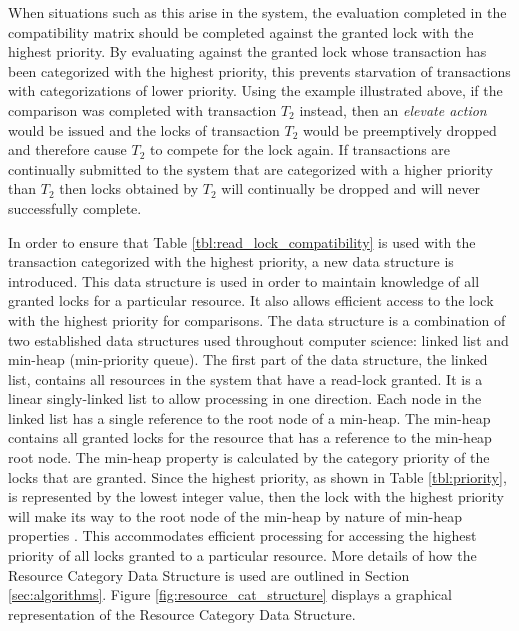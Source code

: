 \documentclass[conference]{IEEEtran}
\begin{document}
When situations such as this arise in the system, the evaluation completed in the compatibility matrix should be completed against the granted lock with the highest priority. By evaluating against the granted lock whose transaction has been categorized with the highest priority, this prevents starvation of transactions with categorizations of lower priority. Using the example illustrated above, if the comparison was completed with transaction $T_{2}$ instead, then an \textit{elevate action} would be issued and the locks of transaction $T_{2}$ would be preemptively dropped and therefore cause $T_{2}$ to compete for the lock again. If transactions are continually submitted to the system that are categorized with a higher priority than $T_{2}$ then locks obtained by $T_{2}$ will continually be dropped and will never successfully complete.

In order to ensure that Table \ref{tbl:read_lock_compatibility} is used with the transaction categorized with the highest priority, a new data structure is introduced. This data structure is used in order to maintain knowledge of all granted locks for a particular resource. It also allows efficient access to the lock with the highest priority for comparisons. The data structure is a combination of two established data structures used throughout computer science: linked list and min-heap (min-priority queue). The first part of the data structure, the linked list, contains all resources in the system that have a read-lock granted. It is a linear singly-linked list to allow processing in one direction. Each node in the linked list has a single reference to the root node of a min-heap. The min-heap contains all granted locks for the resource that has a reference to the min-heap root node. The min-heap property is calculated by the category priority of the locks that are granted. Since the highest priority, as shown in Table \ref{tbl:priority}, is represented by the lowest integer value, then the lock with the highest priority will make its way to the root node of the min-heap by nature of min-heap properties \cite[p.162]{Cormen_Algorithms}. This accommodates efficient processing for accessing the highest priority of all locks granted to a particular resource. More details of how the Resource Category Data Structure is used are outlined in Section \ref{sec:algorithms}. Figure \ref{fig:resource_cat_structure} displays a graphical representation of the Resource Category Data Structure.
\end{document}
